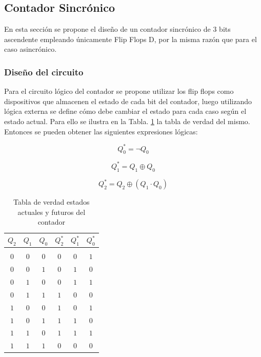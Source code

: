 \subsection{Contador Sincr\'onico}
En esta secci\'on se propone el dise\~no de un contador sincr\'onico de 3 bits ascendente empleando \'unicamente Flip Flops D, por la misma raz\'on que para el caso asincr\'onico.

\subsubsection{Dise\~no del circuito}
Para el circuito l\'ogico del contador se propone utilizar los flip flops como dispositivos que almacenen el estado de cada bit del contador,
luego utilizando l\'ogica externa se define c\'omo debe cambiar el estado para cada caso seg\'un el estado actual. Para ello se ilustra en la Tabla. \ref{table:tabla_verdad_contador}
la tabla de verdad del mismo. Entonces se pueden obtener las siguientes expresiones l\'ogicas:

\begin{equation}
    Q^{*}_0 = \neg Q_0 
\end{equation}

\begin{equation}
    Q^{*}_1 = Q_1 \oplus Q_0 
\end{equation}

\begin{equation}
    Q^{*}_2 = Q_2 \oplus (Q_1 \cdot Q_0) 
\end{equation}

\begin{table}[H]
    \centering
    \begin{tabular}{c c c | c c c}
        $Q_2$ & $Q_1$ & $Q_0$ & $Q^{*}_2$ & $Q^{*}_1$ & $Q^{*}_0$ \\ 
        \hline \\
        $0$ & $0$ & $0$ & $0$ & $0$ & $1$ \\
        $0$ & $0$ & $1$ & $0$ & $1$ & $0$ \\
        $0$ & $1$ & $0$ & $0$ & $1$ & $1$ \\
        $0$ & $1$ & $1$ & $1$ & $0$ & $0$ \\
        $1$ & $0$ & $0$ & $1$ & $0$ & $1$ \\
        $1$ & $0$ & $1$ & $1$ & $1$ & $0$ \\
        $1$ & $1$ & $0$ & $1$ & $1$ & $1$ \\
        $1$ & $1$ & $1$ & $0$ & $0$ & $0$ \\
    \end{tabular}
    \caption{Tabla de verdad estados actuales y futuros del contador}
    \label{table:tabla_verdad_contador}
\end{table}

